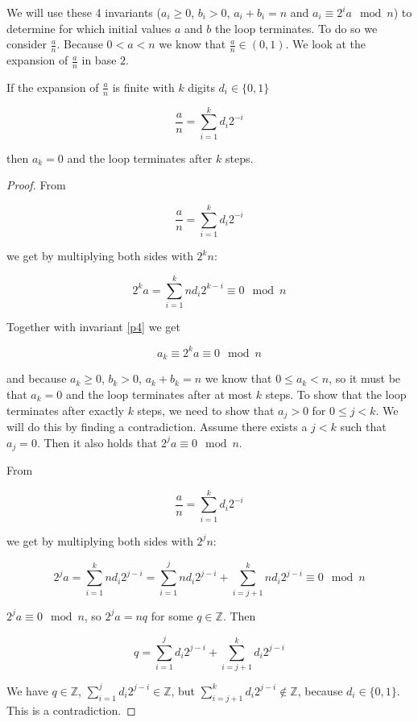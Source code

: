 We will use these 4 invariants ($a_i \geq 0$, $b_i > 0$, $a_i + b_i = n$ and $a_i \equiv 2^i a \mod n$) to determine for which initial values $a$ and $b$ the loop terminates. To do so we consider $\frac{a}{n}$. Because $0 < a < n$ we know that $\frac{a}{n} \in (0, 1)$. We look at the expansion of $\frac{a}{n}$ in base $2$.

\begin{thm}
If the expansion of $\frac{a}{n}$ is finite with $k$ digits $d_i \in \{0, 1\}$

$$
  \frac{a}{n} = \sum_{i = 1}^k d_i 2^{-i}
$$

then $a_k = 0$ and the loop terminates after $k$ steps.
\end{thm}

\begin{proof}

From 

$$
  \frac{a}{n} = \sum_{i = 1}^k d_i 2^{-i}
$$

we get by multiplying both sides with $2^k n$:

$$
  2^k a = \sum_{i = 1}^k n d_i 2^{k-i} \equiv 0 \mod n
$$

Together with invariant \ref{p4} we get

$$
  a_k \equiv 2^k a \equiv 0 \mod n
$$

and because $a_k \geq 0$, $b_k > 0$, $a_k + b_k = n$ we know that $0 \leq a_k < n$, so it must be that $a_k=0$ and the loop terminates after at most $k$ steps. To show that the loop terminates after exactly $k$ steps, we need to show that $a_j > 0$ for $0 \leq j < k$. We will do this by finding a contradiction. Assume there exists a $j < k$ such that $a_j = 0$. Then it also holds that $2^j a \equiv 0 \mod n$.

From 

$$
  \frac{a}{n} = \sum_{i = 1}^k d_i 2^{-i}
$$

we get by multiplying both sides with $2^j n$:

$$
  2^j a = \sum_{i = 1}^k n d_i 2^{j-i} = \sum_{i = 1}^j n d_i 2^{j-i} + \sum_{i = j+1}^k n d_i 2^{j-i} \equiv 0 \mod n
$$

$2^j a \equiv 0 \mod n$, so $2^j a = n q$ for some $q \in \mathbb{Z}$. Then

$$
  q = \sum_{i = 1}^j d_i 2^{j-i} + \sum_{i = j+1}^k d_i 2^{j-i}
$$

We have $q \in \mathbb{Z}$, $\sum_{i = 1}^j d_i 2^{j-i} \in \mathbb{Z}$, but $\sum_{i = j+1}^k d_i 2^{j-i} \notin \mathbb{Z}$, because $d_i \in \{0, 1\}$. This is a contradiction.

\end{proof}


